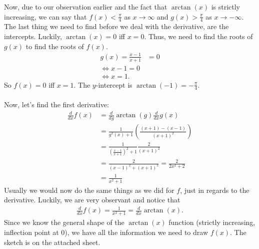 \documentclass{article}
\begin{document}
Now, due to our observation earlier and the fact that $\arctan(x)$ is strictly increasing, we can say that $f(x)<\frac{\pi}{4}$ as $x\to\infty$ and $g(x)>\frac{\pi}{4}$ as $x\to -\infty$.\\
The last thing we need to find before we deal with the derivative, are the intercepts. Luckily, $\arctan(x)=0$ iff $x=0$. Thus, we need to find the roots of $g(x)$ to find the roots of $f(x)$.
\begin{align*}
	g(x)=\frac{x-1}{x+1} & =0 \\
	\Leftrightarrow x-1 = 0   \\
	\Leftrightarrow x = 1.
\end{align*}
So $f(x)=0$ iff $x=1$. The $y$-intercept is $\arctan(-1)=-\frac{\pi}{4}$.\\\\
Now, let's find the first derivative:
\begin{align*}
	\frac{d}{dx}f(x) & =\frac{d}{dg}\arctan(g)\frac{d}{dx}g(x)                      \\
	                 & =\frac{1}{g^2(x)+1}\left(\frac{(x+1)-(x-1)}{(x+1)^2}\right)  \\
	                 & =\frac{1}{\left(\frac{x-1}{x+1}\right)^2+1}\frac{2}{(x+1)^2} \\
	                 & =\frac{2}{(x-1)^2+(x+1)^2} = \frac{2}{2x^2+2}                \\
	                 & =\frac{1}{x^2+1}
\end{align*}
Usually we would now do the same things as we did for $f$, just in regards to the derivative. Luckily, we are very observant and notice that
\begin{align*}
	\frac{d}{dx}f(x)=\frac{1}{x^2+1}=\frac{d}{dx}\arctan(x).
\end{align*}
Since we know the general shape of the $\arctan(x)$ function (strictly increasing, inflection point at $0$), we have all the information we need to draw $f(x)$. The sketch is on the attached sheet.
\end{document}
